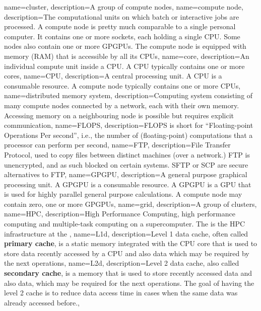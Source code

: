 {
  name={cluster},
  description={A group of compute nodes},
}
{
  name={compute node},
  description={The computational units on which batch or interactive jobs are processed. A compute node is pretty much comparable to a single personal computer. It contains one or more sockets, each holding a single CPU. Some nodes also contain one or more GPGPUs. The compute node is equipped with memory (RAM) that is accessible by all its CPUs},
}
{
  name={core},
  description={An individual compute unit inside a CPU. A CPU typically contains one or more cores},
}
{
  name={CPU},
  description={A central processing unit. A CPU is a consumable resource. A compute node typically contains one or more CPUs},
}
{
  name={distributed memory system},
  description={Computing system consisting of many compute nodes connected by a network, each with their own memory. Accessing memory on a neighbouring node is possible but requires explicit communication},
}
{
  name={FLOPS},
  description={FLOPS is short for ``Floating-point Operations Per second'', i.e., the number of (floating-point) computations that a processor can perform per second},
}
{
  name={FTP},
  description={File Transfer Protocol, used to copy files between distinct machines (over a network.) FTP is unencrypted, and as such blocked on certain systems. SFTP or SCP are secure alternatives to FTP},
}
{
  name={GPGPU},
  description={A general purpose graphical processing unit. A GPGPU is a consumable resource. A GPGPU is a GPU that is used for highly parallel general purpose calculations. A compute node may contain zero, one or more GPGPUs},
}
{
  name={grid},
  description={A group of clusters},
}
{
  name={HPC},
  description={High Performance Computing, high performance computing and multiple-task computing on a supercomputer. The \hpcInfra is the HPC infrastructure at the \university},
}
{
  name={L1d},
  description={Level 1 data cache, often called \textbf{primary cache}, is a static memory integrated with the CPU core that is used to store data recently accessed by a CPU and also data which may be required by the next operations},
}
{
  name={L2d},
  description={Level 2 data cache, also called \textbf{secondary cache}, is a memory that is used to store recently accessed data and also data, which may be required for the next operations. The goal of having the level 2 cache is to reduce data access time in cases when the same data was already accessed before.},
}
